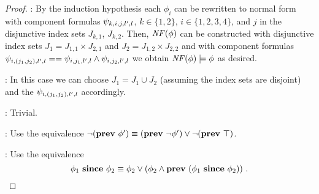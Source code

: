 \begin{proof}
\noindent{}: By the induction hypothesis each $\phi_i$ can be rewritten to normal form with component formulas
$\psi_{k,i,j,l',l}$, $k\in\{1,2\}$, $i\in\{1,2,3,4\}$, and $j$ in the disjunctive index sets $J_{k,1}$, $J_{k,2}$. 
Then, $\mathit{NF}(\phi)$ can be constructed with disjunctive index sets $J_1 = J_{1,1}\times J_{2,1}$ and $J_2 = J_{1,2}\times J_{2,2}$ and with
component formulas 
$\psi_{i,(j_1,j_2),l',l}==\psi_{i,j_1,l',l} \wedge \psi_{i,j_2,l',l}$ we obtain $\mathit{NF}(\phi)\models \phi$ as desired.

\noindent{}: In this case we can choose
$J_1 = J_1 \cup J_2$ (assuming the index sets are disjoint) and the $\psi_{i,(j_1,j_2),l',l}$ accordingly.

\noindent{}: Trivial.

\noindent{}: Use the equivalence $\neg(\mathbf{prev}\ \phi') \equiv (\mathbf{prev}\ \neg\phi') \vee \neg(\mathbf{prev}\ \top)$.

\noindent{}: Use the equivalence 
\[
\phi_1\ \Since\ \phi_2 \equiv \phi_2 \vee (\phi_2 \wedge \Prev\ (\phi_1\ \Since\ \phi_2))\ .
\]


\end{proof}

